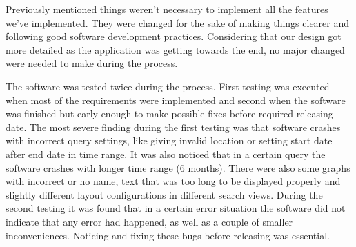 \documentclass{article}
\begin{document}
Previously mentioned things weren’t necessary to implement all the features we’ve implemented. They were changed for the sake of making things clearer and following good software development practices. Considering that our design got more detailed as the application was getting towards the end, no major changed were needed to make during the process.

The software was tested twice during the process. First testing was executed when most of the requirements were implemented and second when the software was finished but early enough to make possible fixes before required releasing date. The most severe finding during the first testing was that software crashes with incorrect query settings, like giving invalid location or setting start date after end date in time range. It was also noticed that in a certain query the software crashes with longer time range (6 months). There were also some graphs with incorrect or no name, text that was too long to be displayed properly and slightly different layout configurations in different search views. During the second testing it was found that in a certain error situation the software did not indicate that any error had happened, as well as a couple of smaller inconveniences. Noticing and fixing these bugs before releasing was essential.
\end{document}

